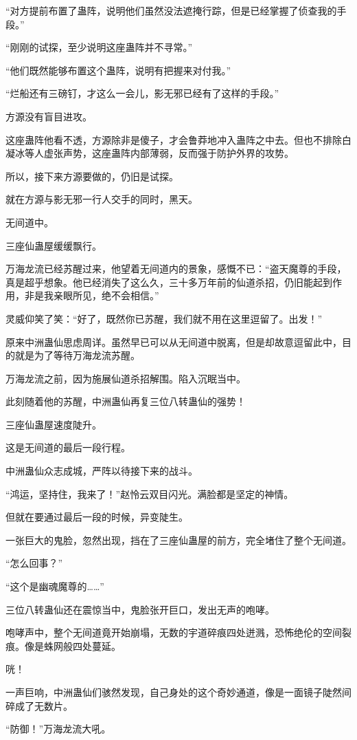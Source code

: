 \begin{this_body}
“对方提前布置了蛊阵，说明他们虽然没法遮掩行踪，但是已经掌握了侦查我的手段。”

“刚刚的试探，至少说明这座蛊阵并不寻常。”

“他们既然能够布置这个蛊阵，说明有把握来对付我。”

“烂船还有三磅钉，才这么一会儿，影无邪已经有了这样的手段。”

方源没有盲目进攻。

这座蛊阵他看不透，方源除非是傻子，才会鲁莽地冲入蛊阵之中去。但也不排除白凝冰等人虚张声势，这座蛊阵内部薄弱，反而强于防护外界的攻势。

所以，接下来方源要做的，仍旧是试探。

就在方源与影无邪一行人交手的同时，黑天。

无间道中。

三座仙蛊屋缓缓飘行。

万海龙流已经苏醒过来，他望着无间道内的景象，感慨不已：“盗天魔尊的手段，真是超乎想象。他已经消失了这么久，三十多万年前的仙道杀招，仍旧能起到作用，非是我亲眼所见，绝不会相信。”

灵威仰笑了笑：“好了，既然你已苏醒，我们就不用在这里逗留了。出发！”

原来中洲蛊仙思虑周详。虽然早已可以从无间道中脱离，但是却故意逗留此中，目的就是为了等待万海龙流苏醒。

万海龙流之前，因为施展仙道杀招解围。陷入沉眠当中。

此刻随着他的苏醒，中洲蛊仙再复三位八转蛊仙的强势！

三座仙蛊屋速度陡升。

这是无间道的最后一段行程。

中洲蛊仙众志成城，严阵以待接下来的战斗。

“鸿运，坚持住，我来了！”赵怜云双目闪光。满脸都是坚定的神情。

但就在要通过最后一段的时候，异变陡生。

一张巨大的鬼脸，忽然出现，挡在了三座仙蛊屋的前方，完全堵住了整个无间道。

“怎么回事？”

“这个是幽魂魔尊的……”

三位八转蛊仙还在震惊当中，鬼脸张开巨口，发出无声的咆哮。

咆哮声中，整个无间道竟开始崩塌，无数的宇道碎痕四处迸溅，恐怖绝伦的空间裂痕。像是蛛网般四处蔓延。

咣！

一声巨响，中洲蛊仙们骇然发现，自己身处的这个奇妙通道，像是一面镜子陡然间碎成了无数片。

“防御！”万海龙流大吼。


\end{this_body}
